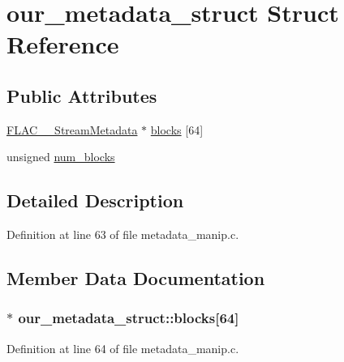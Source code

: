 \hypertarget{structour__metadata__struct}{}\section{our\+\_\+metadata\+\_\+struct Struct Reference}
\label{structour__metadata__struct}
\subsection*{Public Attributes}
\begin{DoxyCompactItemize}
\item 
\hyperlink{struct_f_l_a_c_____stream_metadata}{F\+L\+A\+C\+\_\+\+\_\+\+Stream\+Metadata} $\ast$ \hyperlink{structour__metadata__struct_a3d0a9ddad9072a8e251af6abd28720cc}{blocks} \mbox{[}64\mbox{]}
\item 
unsigned \hyperlink{structour__metadata__struct_aac3aacb18be179c40e7622b00619dfa5}{num\+\_\+blocks}
\end{DoxyCompactItemize}


\subsection{Detailed Description}


Definition at line 63 of file metadata\+\_\+manip.\+c.



\subsection{Member Data Documentation}
\subsubsection[{\texorpdfstring{blocks}{blocks}}]{$\ast$ our\+\_\+metadata\+\_\+struct\+::blocks\mbox{[}64\mbox{]}}\hypertarget{structour__metadata__struct_a3d0a9ddad9072a8e251af6abd28720cc}{}\label{structour__metadata__struct_a3d0a9ddad9072a8e251af6abd28720cc}


Definition at line 64 of file metadata\+\_\+manip.\+c.

